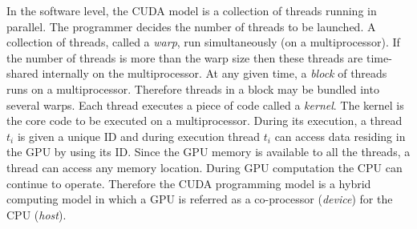In the software level, the CUDA model is a collection of threads
running in parallel.  The programmer decides the number of threads
to be launched.  A collection of threads, called a \textit{warp},
run simultaneously (on a multiprocessor).  If the number of
threads is more than the warp size then these threads are time-shared
internally on the multiprocessor.  At any given time, a \textit{block}
of threads runs on a multiprocessor.  Therefore threads in a block may
be bundled into several warps.  Each thread executes a
piece of code called a \textit{kernel}.  The kernel is the core code
to be executed on a multiprocessor.  During its execution, a thread
$t_i$ is given a unique ID and during execution thread $t_i$ can
access data residing in the GPU by using its ID.  Since the GPU memory
is available to all the threads, a thread can access any memory
location.  During GPU computation the CPU can continue to operate.
Therefore the CUDA programming model is a hybrid computing model in
which a GPU is referred as a co-processor (\textit{device}) for the
CPU (\textit{host}).
